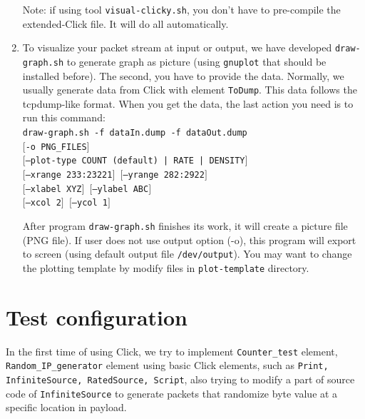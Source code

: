 \documentclass[a4paper]{article}
\begin{document}
\begin{enumerate}
Note: if using tool \texttt{visual-clicky.sh}, you don't have to pre-compile the extended-Click file. It will do all automatically.
        \item To visualize your packet stream at input or output, we have developed \texttt{draw-graph.sh} to generate graph as picture (using \texttt{gnuplot} that should be installed before). The second, you have to provide the data. Normally, we usually generate data from Click with element \texttt{ToDump}. This data follows the tcpdump-like format. When you get the data, the last action you need is to run this command:\\
\texttt{draw-graph.sh -f dataIn.dump -f dataOut.dump \\
      $[$-o PNG\_FILES$]$\\
      $[$--plot-type COUNT (default) | RATE | DENSITY$]$\\
      $[$--xrange 233:23221$]$  $[$--yrange 282:2922$]$\\
      $[$--xlabel XYZ$]$  $[$--ylabel ABC$]$\\
      $[$--xcol 2$]$  $[$--ycol 1$]$}
      
  After program \texttt{draw-graph.sh} finishes its work, it will create a picture file (PNG file). If user does not use output option (-o), this program will export to screen (using default output file \texttt{/dev/output}). You may want to change the plotting template by modify files in \texttt{plot-template} directory.
      \end{enumerate}
  \section{Test configuration}
  In the first time of using Click, we try to implement \texttt{Counter\_test} element, \texttt{Random\_IP\_generator} element using basic Click elements, such as \texttt{Print, InfiniteSource, RatedSource, Script}, also trying to modify a part of source code of \texttt{InfiniteSource} to generate packets that randomize byte value at a specific location in payload.
\end{document}
